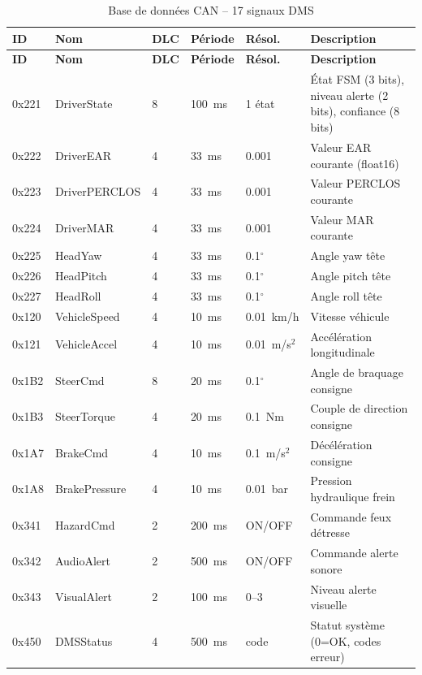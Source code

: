 \documentclass[12pt,a4paper]{report}
\newcommand{\degr}{\ensuremath{^{\circ}}}
\begin{document}
\begin{longtable}{C{1.5cm} L{3cm} C{1cm} C{1.5cm} C{1.2cm} L{4.5cm}}
\caption{Base de donn\'ees CAN -- 17 signaux DMS}
\label{tab:can_full} \\
\toprule
\textbf{ID} & \textbf{Nom} & \textbf{DLC} & \textbf{P\'eriode} & \textbf{R\'esol.} & \textbf{Description} \\
\midrule
\endfirsthead
\toprule \textbf{ID} & \textbf{Nom} & \textbf{DLC} & \textbf{P\'eriode} & \textbf{R\'esol.} & \textbf{Description} \\ \midrule
\endhead \bottomrule \endfoot
0x221 & DriverState & 8 & 100~ms & 1 \'etat & \'Etat FSM (3 bits), niveau alerte (2 bits), confiance (8 bits) \\
0x222 & DriverEAR & 4 & 33~ms & 0.001 & Valeur EAR courante (float16) \\
0x223 & DriverPERCLOS & 4 & 33~ms & 0.001 & Valeur PERCLOS courante \\
0x224 & DriverMAR & 4 & 33~ms & 0.001 & Valeur MAR courante \\
0x225 & HeadYaw & 4 & 33~ms & 0.1\degr & Angle yaw t\^ete \\
0x226 & HeadPitch & 4 & 33~ms & 0.1\degr & Angle pitch t\^ete \\
0x227 & HeadRoll & 4 & 33~ms & 0.1\degr & Angle roll t\^ete \\
0x120 & VehicleSpeed & 4 & 10~ms & 0.01~km/h & Vitesse v\'ehicule \\
0x121 & VehicleAccel & 4 & 10~ms & 0.01~m/s$^2$ & Acc\'el\'eration longitudinale \\
0x1B2 & SteerCmd & 8 & 20~ms & 0.1\degr & Angle de braquage consigne \\
0x1B3 & SteerTorque & 4 & 20~ms & 0.1~Nm & Couple de direction consigne \\
0x1A7 & BrakeCmd & 4 & 10~ms & 0.1~m/s$^2$ & D\'ec\'el\'eration consigne \\
0x1A8 & BrakePressure & 4 & 10~ms & 0.01~bar & Pression hydraulique frein \\
0x341 & HazardCmd & 2 & 200~ms & ON/OFF & Commande feux d\'etresse \\
0x342 & AudioAlert & 2 & 500~ms & ON/OFF & Commande alerte sonore \\
0x343 & VisualAlert & 2 & 100~ms & 0--3 & Niveau alerte visuelle \\
0x450 & DMSStatus & 4 & 500~ms & code & Statut syst\`eme (0=OK, codes erreur) \\
\bottomrule
\end{longtable}
\end{document}
